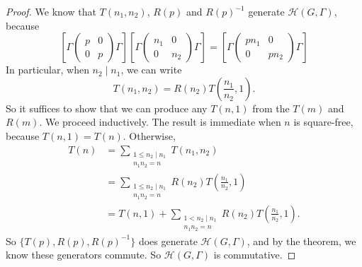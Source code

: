 \documentclass[a4paper]{article}
\begin{document}
\begin{proof}
  We know that $T(n_1, n_2)$, $R(p)$ and $R(p)^{-1}$ generate $\mathcal{H}(G, \Gamma)$, because
  \[
    \left[\Gamma
      \begin{pmatrix}
        p & 0 \\ 0& p
      \end{pmatrix}\Gamma
    \right]
    \left[\Gamma
      \begin{pmatrix}
        n_1 & 0 \\ 0& n_2
      \end{pmatrix} \Gamma
    \right]
    =
    \left[\Gamma
      \begin{pmatrix}
        pn_1 & 0 \\ 0& pn_2
      \end{pmatrix} \Gamma
    \right]
  \]
  In particular, when $n_2 \mid n_1$, we can write
  \[
    T(n_1, n_2) = R(n_2) T\left(\frac{n_1}{n_2}, 1\right).
  \]
  So it suffices to show that we can produce any $T(n, 1)$ from the $T(m)$ and $R(m)$. We proceed inductively. The result is immediate when $n$ is square-free, because $T(n, 1) = T(n)$. Otherwise,
  \begin{align*}
    T(n) &= \sum_{\substack{1 \leq n_2 \mid n_1\\n_1 n_2 = n}} T(n_1, n_2) \\
    &= \sum_{\substack{1 \leq n_2 \mid n_1\\n_1 n_2 = n}} R(n_2) T\left(\frac{n_1}{n_2}, 1\right) \\
    &= T(n, 1) + \sum_{\substack{1 < n_2 \mid n_1\\n_1 n_2 = n}} R(n_2) T\left(\frac{n_1}{n_2}, 1\right).
  \end{align*}
  So $\{T(p), R(p), R(p)^{-1}\}$ does generate $\mathcal{H}(G, \Gamma)$, and by the theorem, we know these generators commute. So $\mathcal{H}(G, \Gamma)$ is commutative.
\end{proof}
\end{document}
